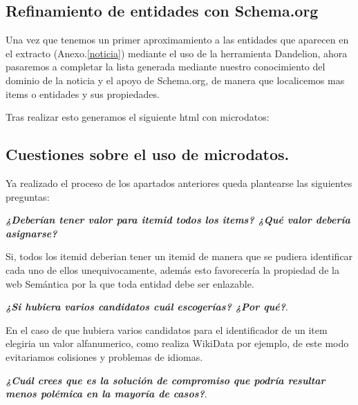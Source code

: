 \documentclass{llncs}   %
\begin{document}
\subsection{Refinamiento de entidades con Schema.org}

Una vez que tenemos un primer aproximamiento a las entidades que aparecen en el extracto 
(Anexo.\ref{noticia}) mediante el uso de la herramienta Dandelion, ahora pasaremos a completar 
la lista generada mediante nuestro conocimiento del dominio de la noticia y el apoyo de Schema.org, 
de manera que localicemos mas items o entidades y sus propiedades.

Tras realizar esto generamos el siguiente html con microdatos:



\subsection{Cuestiones sobre el uso de microdatos.}

Ya realizado el proceso de los apartados anteriores queda plantearse las siguientes preguntas:

\textbf{\textit{¿Deberían tener valor para itemid todos los items? ¿Qué valor debería asignarse?}}

Si, todos los itemid deberian tener un itemid de manera que se pudiera identificar cada uno de ellos unequivocamente, 
además esto favorecería la propiedad de la web Semántica por la que toda entidad debe ser enlazable.

\textbf{\textit{¿Si hubiera varios candidatos cuál escogerías? ¿Por qué?}}.

En el caso de que hubiera varios candidatos para el identificador de un item elegiria un valor alfanumerico, como 
realiza WikiData por ejemplo, de este modo evitariamos colisiones y problemas de idiomas.

\textbf{\textit{¿Cuál crees que es la solución de compromiso que podría resultar menos polémica en la mayoría de casos?}}.
\end{document}
